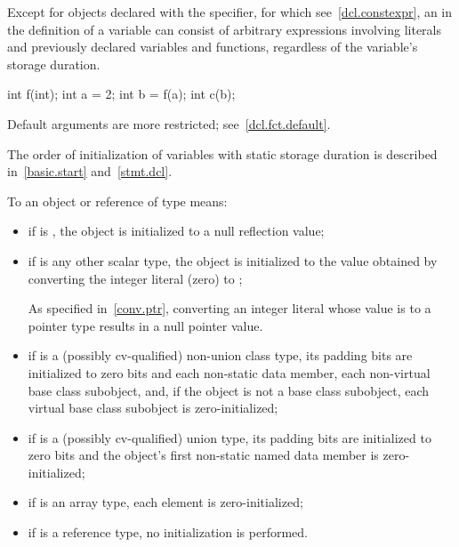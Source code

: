 \pnum
Except for objects declared with the  specifier, for which see~\ref{dcl.constexpr},
an  in the definition of a variable can consist of
arbitrary expressions involving literals and previously declared
variables and functions,
regardless of the variable's storage duration.
\begin{example}
\begin{codeblock}
int f(int);
int a = 2;
int b = f(a);
int c(b);
\end{codeblock}
\end{example}

\pnum
\begin{note}
Default arguments are more restricted; see~\ref{dcl.fct.default}.
\end{note}

\pnum
\begin{note}
The order of initialization of variables with static storage duration is described in~\ref{basic.start}
and~\ref{stmt.dcl}.
\end{note}

\pnum
{}%
%
%
To 
an object or reference of type  means:
\begin{itemize}
\item
if  is ,
the object is initialized to a null reflection value;
\item
if  is any other scalar type,
the object is initialized to the value
obtained by converting the integer literal  (zero) to ;
\begin{footnote}
As specified in~\ref{conv.ptr}, converting an integer
literal whose value is
to a pointer type results in a null pointer value.
\end{footnote}

\item
if
is a (possibly cv-qualified) non-union class type,
its padding bits are initialized to zero bits and
each non-static data member,
each non-virtual base class subobject, and,
if the object is not a base class subobject,
each virtual base class subobject
is zero-initialized;

\item
if
is a (possibly cv-qualified) union type,
its padding bits are initialized to zero bits and
the
object's first non-static named
data member
is zero-initialized;

\item
if
is an array type,
each element is zero-initialized;
\item
if
is a reference type, no initialization is performed.
\end{itemize}

